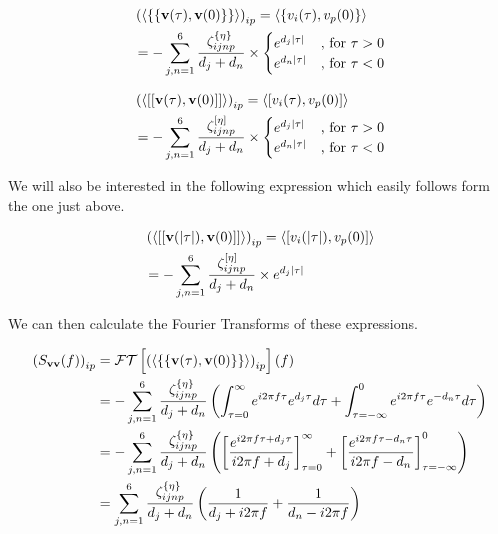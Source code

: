 \documentclass[12pt]{article}
\newcommand{\bv}[1]{\bold{#1}}
\begin{document}
\begin{align}
&\left(\Braket{\left\{\left\{\bv{v}(\tau),\bv{v}(0)\right\}\right\}}\right)_{ip} = \Braket{\left\{v_i(\tau),v_p(0)\right\}} \\
&=-\sum_{j,n=1}^6 \frac{\zeta_{ijnp}^{\{\eta\}}}{d_j+d_n} \times 
\begin{cases}
e^{d_j \lvert\tau\rvert} & \text{, for } \tau>0\\
e^{d_n \lvert\tau\rvert} & \text{, for } \tau<0\\
\end{cases}
\end{align}

\begin{align}
&\left(\Braket{\left[\left[\bv{v}(\tau),\bv{v}(0)\right]\right]}\right)_{ip} = \Braket{\left[v_i(\tau),v_p(0)\right]} \\
&=-\sum_{j,n=1}^6 \frac{\zeta_{ijnp}^{[\eta]}}{d_j+d_n} \times 
\begin{cases}
e^{d_j \lvert\tau\rvert} & \text{, for } \tau>0\\
e^{d_n \lvert\tau\rvert} & \text{, for } \tau<0\\
\end{cases}
\end{align}

We will also be interested in the following expression which easily follows form the one just above.

\begin{align}
&\left(\Braket{\left[\left[\bv{v}(\lvert\tau\rvert),\bv{v}(0)\right]\right]}\right)_{ip} = \Braket{\left[v_i(\lvert\tau\rvert),v_p(0)\right]} \\
&=-\sum_{j,n=1}^6 \frac{\zeta_{ijnp}^{[\eta]}}{d_j+d_n} \times 
e^{d_j \lvert\tau\rvert}\\
\end{align}

We can then calculate the Fourier Transforms of these expressions.

\begin{align}
\left(S_{{\bv{v}\bv{v}}}(f)\right)_{ip} &= \mathcal{FT}\left[\left(\Braket{\left\{\left\{\bv{v}(\tau),\bv{v}(0)\right\}\right\}}\right)_{ip}\right](f)\\
&=-\sum_{j,n=1}^6 \frac{\zeta_{ijnp}^{\{\eta\}}}{d_j+d_n} \left(\int_{\tau = 0}^{\infty} e^{i 2\pi f \tau} e^{d_j \tau} d\tau + \int_{\tau = -\infty}^{0} e^{i 2\pi f \tau} e^{-d_n \tau} d\tau \right)\\
&= -\sum_{j,n=1}^6 \frac{\zeta_{ijnp}^{\{\eta\}}}{d_j+d_n} \left(\left[\frac{e^{i2\pi f \tau + d_j \tau}}{i 2\pi f + d_j}\right]_{\tau=0}^{\infty} + \left[\frac{e^{i2\pi f \tau - d_n \tau}}{i 2\pi f - d_n} \right]_{\tau=-\infty}^0\right)\\
&= \sum_{j,n=1}^6 \frac{\zeta_{ijnp}^{\{\eta\}}}{d_j+d_n} \left(\frac{1}{d_j + i 2\pi f} + \frac{1}{d_n - i 2\pi f} \right)
\end{align}
\end{document}
